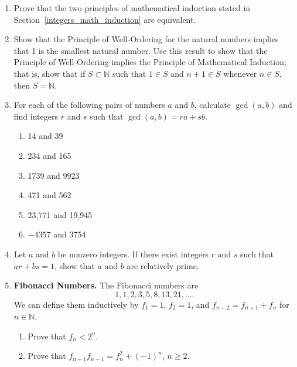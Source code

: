 {\begin{enumerate}
\item
Prove that the two principles of mathematical induction stated in Section~\ref{integers_math_induction} are equivalent. 

\item
Show that the Principle of Well-Ordering for the natural numbers implies that 1 is the smallest natural number.  Use this result to show that the Principle of Well-Ordering implies the Principle of Mathematical Induction; that is, show that if $S \subset {\mathbb N}$ such that $1 \in S$ and $n + 1 \in S$ whenever $n \in S$, then $S = {\mathbb N}$.  

\item
For each of the following pairs of numbers $a$ and $b$, calculate $\gcd(a,b)$ and find integers $r$ and $s$ such that  $\gcd(a,b) = ra + sb$. 
\begin{multicols}{2}
\begin{enumerate}

\item 
14 and 39

\item
234 and 165

\item
1739 and 9923

\item
471 and 562

\item
23,771 and 19,945

\item
$-4357$ and 3754

\end{enumerate}
\end{multicols}
 
\item
Let $a$ and $b$ be nonzero integers. If there exist integers $r$ and $s$ such that $ar +bs =1$, show that $a$ and $b$ are relatively prime.
 
 
\item
{\bf Fibonacci Numbers.}
The Fibonacci numbers are
$$
1, 1, 2, 3, 5, 8, 13, 21, \ldots.
$$
We can define them inductively by $f_1 = 1$, $f_2 = 1$, and $f_{n + 2} = f_{n + 1} + f_n$ for $n \in {\mathbb N}$. 
\begin{enumerate}
 
 \item
Prove that $f_n < 2^n$.
 
 \item
Prove that $f_{n + 1} f_{n - 1} = f^2_n + (-1)^n$, $n \geq 2$.
 

\end{enumerate}
\end{enumerate}}
